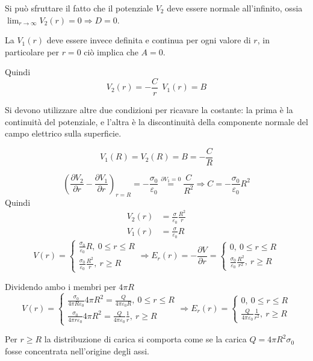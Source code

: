 
Si può sfruttare il fatto che il potenziale $V_2$ deve essere normale all'infinito, ossia
$\lim_{r\to\infty} V_2(r) = 0 \Rightarrow D = 0$.

La $V_1(r)$ deve essere invece definita e continua per ogni valore di $r$, in particolare per $r=0$
ciò implica che $A=0$.

Quindi 
$$V_2(r) = -\frac{C}{r} \ \  V_1(r) = B$$

Si devono utilizzare altre due condizioni per ricavare la costante: la prima è la continuità del 
potenziale, e l'altra è la discontinuità della componente normale del campo elettrico 
sulla superficie.

$$
V_1(R) = V_2(R) = B = -\frac{C}{R}
$$

$$
\left(\frac{\partial V_2}{\partial r} - \frac{\partial V_1}{\partial r}\right)_{r=R} = -\frac{\sigma_0}{\varepsilon_0} \stackrel{\partial V_1 = 0}{=}
\frac{C}{R^2} \Rightarrow C = -\frac{\sigma_0}{\varepsilon_0}R^2
$$
Quindi
$$
\begin{aligned}
V_2(r) &= \frac{\sigma}{\varepsilon_0}\frac{R^2}{r}\\
V_1(r) &= \frac{\sigma}{\varepsilon_0}R
\end{aligned}
$$
$$
V(r) = \begin{cases}
\frac{\sigma_0}{\varepsilon_0}R,\ 0\leq r \leq R \\
\frac{\sigma_0}{\varepsilon_0}\frac{R^2}{r},\ r\geq R
\end{cases}\Rightarrow
E_r(r) = -\frac{\partial V}{\partial r} =
\begin{cases}
0,\ 0\leq r \leq R \\
\frac{\sigma_0}{\varepsilon_0}\frac{R^2}{r^2},\ r\geq R
\end{cases}
$$

Dividendo ambo i membri per $4\pi R$
$$
V(r) = \begin{cases}
\frac{\sigma_0}{4\pi R \varepsilon_0}4\pi R^2 = \frac{Q}{4\pi\varepsilon_0 R},\ 0\leq r \leq R \\
\frac{\sigma_0}{4\pi r \varepsilon_0}4\pi R^2 = \frac{Q}{4\pi\varepsilon_0}\frac{1}{r},\ r\geq R
\end{cases}
\Rightarrow E_r(r) =\begin{cases}
0,\ 0\leq r \leq R \\
\frac{Q}{4\pi\varepsilon_0}\frac{1}{r^2},\ r\geq R
\end{cases}
$$

Per $r\geq R$ la distribuzione di carica si comporta come se la carica $Q = 4 \pi R^2 \sigma_0$ fosse concentrata
nell'origine degli assi.

